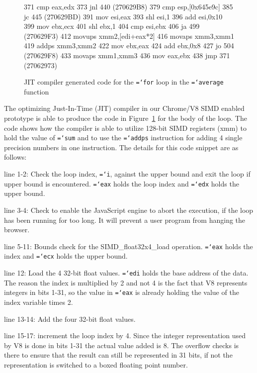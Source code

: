 \documentclass[preprint]{sigplanconf}
\newcommand{\ttt}[1]{{\texttt{\hyphenchar\font=`\-\relax #1}}}%
\begin{document}
\begin{figure}
\begin{small}
\begin{program}[style=tt, number=true]
371  cmp eax,edx
373  jnl 440  (270629B8)
379  cmp esp,[0x645e9c]
385  jc  445  (270629BD)
391  mov esi,eax
393  shl esi,1
396  add esi,0x10
399  mov ebx,ecx
401  shl ebx,1
404  cmp esi,ebx
406  ja  499  (270629F3)
412  movups xmm2,[edi+eax*2]
416  movaps xmm3,xmm1
419  addps xmm3,xmm2
422  mov ebx,eax
424  add ebx,0x8
427  jo  504  (270629F8)
433  movaps xmm1,xmm3
436  mov eax,ebx
438  jmp 371  (27062973)
\end{program}
\end{small}
\caption{JIT compiler generated code for the \ttt{for} loop in the \ttt{average} function}
\label{fig:average-simd-code}
\end{figure}

The optimizing Just-In-Time (JIT) compiler in our Chrome/V8 SIMD enabled
prototype is able to produce the code in Figure~\ref{fig:average-simd-code} for
the body of the loop.  The code shows how the compiler is able to utilize
128-bit SIMD registers (xmm) to hold the value of \ttt{sum} and to use the
\ttt{addps} instruction for adding 4 single precision numbers in one
instruction.  The details for this code snippet are as follows:

line 1-2: Check the loop index, \ttt{i}, against the upper bound and
exit the loop if upper bound is encountered.  \ttt{eax} holds the loop
index and \ttt{edx} holds the upper bound.

line 3-4: Check to enable the JavaScript engine to abort the
execution, if the loop has been running for too long.  It will prevent
a user program from hanging the browser.

line 5-11: Bounds check for the SIMD\_float32x4\_load operation. \ttt{eax}
holds the index and \ttt{ecx} holds the upper bound.

line 12: Load the 4 32-bit float values. \ttt{edi} holds the base address
of the data.  The reason the index is multiplied by 2 and not 4 is the fact
that V8 represents integers in bits 1-31, so the value in \ttt{eax} is already
holding the value of the index variable times 2.

line 13-14: Add the four 32-bit float values.

line 15-17: increment the loop index by 4.  Since the integer representation
used by V8 is done in bits 1-31 the actual value added is 8.  The overflow
checks is there to ensure that the result can still be represented in 31 bits,
if not the representation is switched to a boxed floating point number.
\end{document}
